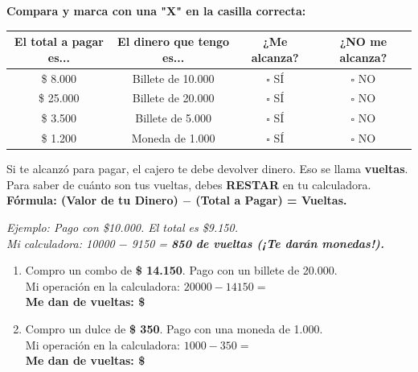 \documentclass[12pt, letterpaper]{article}
\newcommand{\boxfill}[1][2cm]{\tcbox[on line, size=minimal,
	colframe=black!60, colback=white, boxrule=0.8pt, arc=1mm,
	boxsep=3pt, left=2pt, right=2pt, top=2pt, bottom=2pt]%
	{\makebox[#1]{\vphantom{M}}}}
\begin{document}
	\noindent \textbf{Compara y marca con una "X" en la casilla correcta:}
	
	\vspace{0.4cm}
	\renewcommand{\arraystretch}{2}
	\begin{tabular}{|c|c|c|c|}
		\hline
		\textbf{El total a pagar es...} & \textbf{El dinero que tengo es...} & \textbf{¿Me alcanza?} & \textbf{¿NO me alcanza?} \\ \hline
		\$ 8.000 & Billete de 10.000 & $\square$ SÍ & $\square$ NO \\ \hline
		\$ 25.000 & Billete de 20.000 & $\square$ SÍ & $\square$ NO \\ \hline
		\$ 3.500 & Billete de 5.000 & $\square$ SÍ & $\square$ NO \\ \hline
		\$ 1.200 & Moneda de 1.000 & $\square$ SÍ & $\square$ NO \\ \hline
	\end{tabular}
	
	\vspace{0.8cm}
	
	\begin{tcolorbox}[colback=valdark!10, colframe=valdark, title=\textbf{Misión 4: Mis Vueltas (Lo que me sobra)}]
		Si te alcanzó para pagar, el cajero te debe devolver dinero. Eso se llama \textbf{vueltas}. Para saber de cuánto son tus vueltas, debes \textbf{RESTAR} en tu calculadora. \\
		\textbf{Fórmula: (Valor de tu Dinero) $-$ (Total a Pagar) = Vueltas.}
	\end{tcolorbox}
	\vspace{0.2cm}
	
	\noindent \textit{Ejemplo: Pago con \$10.000. El total es \$9.150. \\
		Mi calculadora: 10000 $-$ 9150 = \textbf{850 de vueltas (¡Te darán monedas!).}}
	
	\vspace{0.4cm}
	\begin{enumerate}[label=\textbf{\arabic*.}, itemsep=0.8cm]
		\item Compro un combo de \textbf{\$ 14.150}. Pago con un billete de 20.000. \\
		Mi operación en la calculadora: $20000 - 14150 = $ \\
		\textbf{Me dan de vueltas: \$} \boxfill[3cm]
		
		\item Compro un dulce de \textbf{\$ 350}. Pago con una moneda de 1.000. \\
		Mi operación en la calculadora: $1000 - 350 = $ \\
		\textbf{Me dan de vueltas: \$} \boxfill[3cm]
	\end{enumerate}
	
\end{document}
